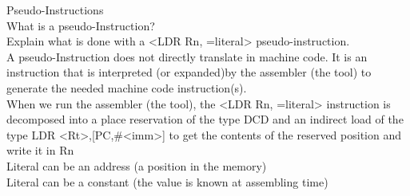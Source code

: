 \begin{example2}{Pseudo-Instructions}\\
What is a pseudo-Instruction? \\Explain what is done with a <LDR Rn, =literal> pseudo-instruction.
\vspace{2mm}\\
A pseudo-Instruction does not directly translate in machine code. It is an instruction that is interpreted (or expanded)by the assembler (the tool) to generate the needed machine code instruction(s).
\vspace{2mm}\\
When we run the assembler (the tool), the <LDR Rn, =literal> instruction is decomposed into a place reservation of the type DCD and an indirect load of the type LDR <Rt>,[PC,\#<imm>] to get the contents of the reserved position and write it in Rn
\vspace{2mm}\\
Literal can be an address (a position in the memory)\\
Literal can be a constant (the value is known at assembling time)
\end{example2}



